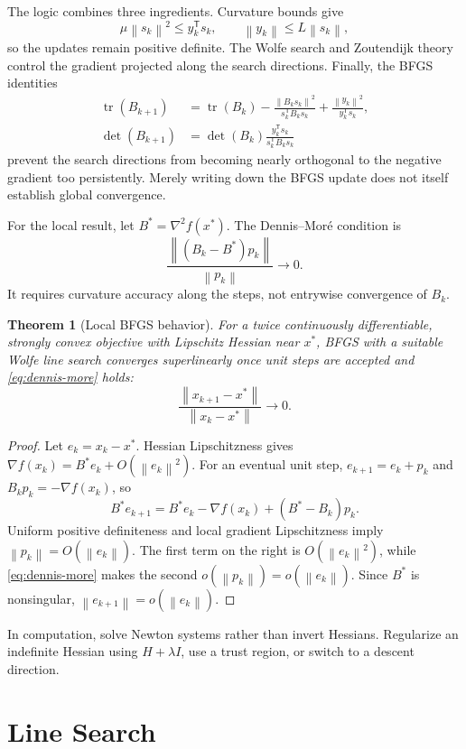 \documentclass[12pt,oneside]{book}
\numberwithin{equation}{section}
\theoremstyle{definition}
\theoremstyle{plain}
\newtheorem{theorem}{Theorem}[section]
\theoremstyle{remark}
\newcommand{\norm}[1]{\left\lVert #1 \right\rVert}
\newcommand{\grad}{\nabla}
\newcommand{\Hess}{\nabla^2}
\newcommand{\tr}{\operatorname{tr}}
\begin{document}
The logic combines three ingredients. Curvature bounds give
\[
 \mu\norm{s_k}^2\leq y_k^\mathsf Ts_k,
 \qquad \norm{y_k}\leq L\norm{s_k},
\]
so the updates remain positive definite. The Wolfe search and Zoutendijk
theory control the gradient projected along the search directions. Finally,
the BFGS identities
\begin{align*}
 \tr(B_{k+1})
 &=\tr(B_k)-\frac{\norm{B_ks_k}^2}{s_k^\mathsf TB_ks_k}
   +\frac{\norm{y_k}^2}{y_k^\mathsf Ts_k},\\
 \det(B_{k+1})
 &=\det(B_k)\frac{y_k^\mathsf Ts_k}{s_k^\mathsf TB_ks_k}
\end{align*}
prevent the search directions from becoming nearly orthogonal to the negative
gradient too persistently. Merely writing down the BFGS update does not itself
establish global convergence.

For the local result, let $B^*=\Hess f(x^*)$. The Dennis--Mor\'e condition is
\begin{equation}
 \frac{\norm{(B_k-B^*)p_k}}{\norm{p_k}}\longrightarrow0.
 \label{eq:dennis-more}
\end{equation}
It requires curvature accuracy along the steps, not entrywise convergence of
$B_k$.

\begin{theorem}[Local BFGS behavior]
For a twice continuously differentiable, strongly convex objective with
Lipschitz Hessian near $x^*$, BFGS with a suitable Wolfe line search converges
superlinearly once unit steps are accepted and \cref{eq:dennis-more} holds:
\[
 \frac{\norm{x_{k+1}-x^*}}{\norm{x_k-x^*}}\longrightarrow0.
\]
\end{theorem}

\begin{proof}
Let $e_k=x_k-x^*$. Hessian Lipschitzness gives
$\grad f(x_k)=B^*e_k+O(\norm{e_k}^2)$. For an eventual unit step,
$e_{k+1}=e_k+p_k$ and $B_kp_k=-\grad f(x_k)$, so
\[
 B^*e_{k+1}
 =B^*e_k-\grad f(x_k)+(B^*-B_k)p_k.
\]
Uniform positive definiteness and local gradient Lipschitzness imply
$\norm{p_k}=O(\norm{e_k})$. The first term on the right is
$O(\norm{e_k}^2)$, while \cref{eq:dennis-more} makes the second
$o(\norm{p_k})=o(\norm{e_k})$. Since $B^*$ is nonsingular,
$\norm{e_{k+1}}=o(\norm{e_k})$.
\end{proof}

In computation, solve Newton systems rather than invert Hessians. Regularize
an indefinite Hessian using $H+\lambda I$, use a trust region, or switch to a
descent direction.

\section{Line Search}
\end{document}
